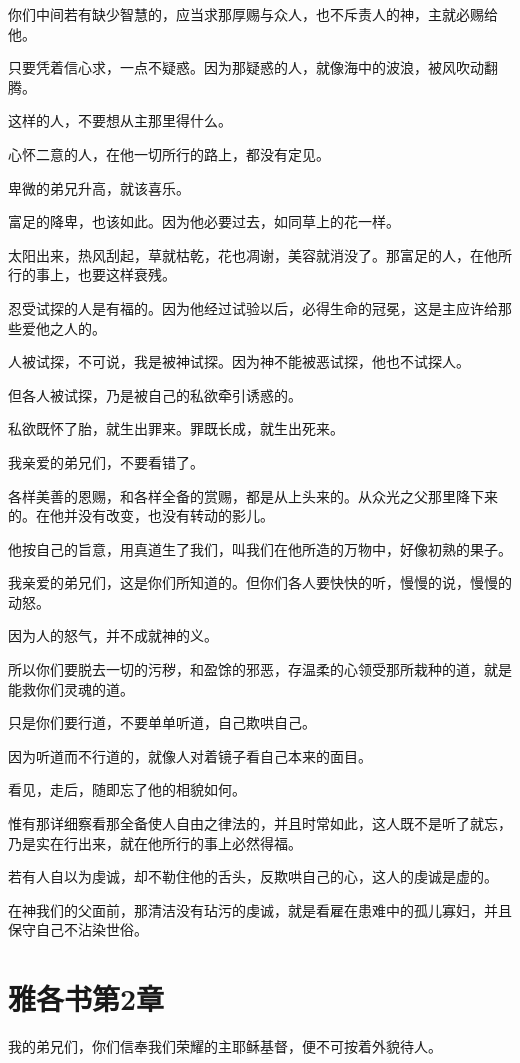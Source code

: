 \documentclass[12pt,oneside]{book}
\begin{document}
你们中间若有缺少智慧的，应当求那厚赐与众人，也不斥责人的神，主就必赐给他。

只要凭着信心求，一点不疑惑。因为那疑惑的人，就像海中的波浪，被风吹动翻腾。

这样的人，不要想从主那里得什么。

心怀二意的人，在他一切所行的路上，都没有定见。

卑微的弟兄升高，就该喜乐。

富足的降卑，也该如此。因为他必要过去，如同草上的花一样。

太阳出来，热风刮起，草就枯乾，花也凋谢，美容就消没了。那富足的人，在他所行的事上，也要这样衰残。

忍受试探的人是有福的。因为他经过试验以后，必得生命的冠冕，这是主应许给那些爱他之人的。

人被试探，不可说，我是被神试探。因为神不能被恶试探，他也不试探人。

但各人被试探，乃是被自己的私欲牵引诱惑的。

私欲既怀了胎，就生出罪来。罪既长成，就生出死来。

我亲爱的弟兄们，不要看错了。

各样美善的恩赐，和各样全备的赏赐，都是从上头来的。从众光之父那里降下来的。在他并没有改变，也没有转动的影儿。

他按自己的旨意，用真道生了我们，叫我们在他所造的万物中，好像初熟的果子。

我亲爱的弟兄们，这是你们所知道的。但你们各人要快快的听，慢慢的说，慢慢的动怒。

因为人的怒气，并不成就神的义。

所以你们要脱去一切的污秽，和盈馀的邪恶，存温柔的心领受那所栽种的道，就是能救你们灵魂的道。

只是你们要行道，不要单单听道，自己欺哄自己。

因为听道而不行道的，就像人对着镜子看自己本来的面目。

看见，走后，随即忘了他的相貌如何。

惟有那详细察看那全备使人自由之律法的，并且时常如此，这人既不是听了就忘，乃是实在行出来，就在他所行的事上必然得福。

若有人自以为虔诚，却不勒住他的舌头，反欺哄自己的心，这人的虔诚是虚的。

在神我们的父面前，那清洁没有玷污的虔诚，就是看雇在患难中的孤儿寡妇，并且保守自己不沾染世俗。

\chapter{雅各书第2章}
我的弟兄们，你们信奉我们荣耀的主耶稣基督，便不可按着外貌待人。
\end{document}
